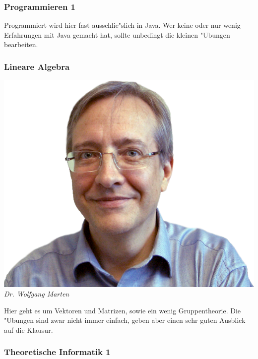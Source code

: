 \subsubsection{Programmieren 1}

Programmiert wird hier fast ausschlie"slich in Java. Wer keine oder nur wenig Erfahrungen mit Java gemacht hat, sollte unbedingt die kleinen "Ubungen bearbeiten.

\subsubsection{Lineare Algebra}

\includegraphics[width=0.8\linewidth]{bilder/dozenten/marten_frei.png}\\
\textit{Dr. Wolfgang Marten}

Hier geht es um Vektoren und Matrizen, sowie ein wenig Gruppentheorie.
Die "Ubungen sind zwar nicht immer einfach, geben aber einen sehr guten Ausblick auf die Klausur.

\subsubsection{Theoretische Informatik 1}

